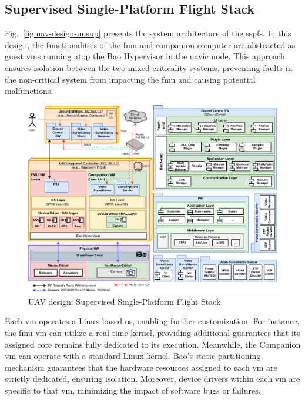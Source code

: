 \subsection{Supervised Single-Platform Flight Stack}
\label{sec:superv-stack}
Fig.~\ref{fig:uav-design-unsup} presents the system architecture of the
\acrfull{sspfs}. In this design, the functionalities of the \gls{fmu} and
companion computer are abstracted as guest \glspl{vm} running atop the Bao
Hypervisor in the \gls{uavic} node. This approach ensures isolation between the two mixed-criticality
systems, preventing faults in the non-critical system from impacting the
\gls{fmu} and causing potential malfunctions.

\begin{figure}[!hbt]
  \centering
  \includegraphics[width=1.0\textwidth]{./img/pdf/uav-main-design-sup.pdf} 
%   
  \caption{UAV design: Supervised Single-Platform Flight Stack}%
  \label{fig:uav-design-sup}
\end{figure}

Each \gls{vm} operates a Linux-based \gls{os}, enabling further customization. For instance, the \gls{fmu} \gls{vm} can utilize a real-time kernel, providing additional guarantees that its assigned core remains fully dedicated to its execution. Meanwhile, the Companion \gls{vm} can operate with a standard Linux kernel. Bao's static partitioning mechanism guarantees that the hardware resources assigned to each \gls{vm} are strictly dedicated, ensuring isolation. Moreover, device drivers within each \gls{vm} are specific to that \gls{vm}, minimizing the impact of software bugs or failures.

